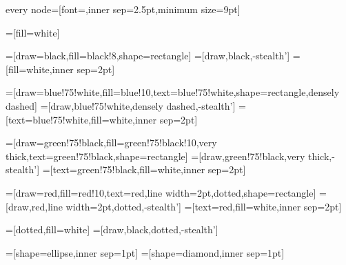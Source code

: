 \usepackage{tikz}
\usetikzlibrary{arrows,automata,positioning,er}

\tikzstyle every node=[font=\footnotesize\sffamily,inner sep=2.5pt,minimum size=9pt]

\newcommand{\red}{red}
\newcommand{\redfill}{\red!10}
\newcommand{\green}{green!75!black}
\newcommand{\greenfill}{\green!10}
\newcommand{\blue}{blue!75!white}
\newcommand{\bluefill}{blue!10}
\newcommand{\grey}{black!8}
=[fill=white]

=[draw=black,fill=\grey,shape=rectangle]
=[draw,black,-stealth']
=[fill=white,inner sep=2pt]

=[draw=\blue,fill=\bluefill,text=\blue,shape=rectangle,densely dashed]
=[draw,\blue,densely dashed,-stealth']
=[text=\blue,fill=white,inner sep=2pt]

=[draw=\green,fill=\greenfill,very thick,text=\green,shape=rectangle]
=[draw,\green,very thick,-stealth']
=[text=\green,fill=white,inner sep=2pt]

=[draw=\red,fill=\redfill,text=\red,line width=2pt,dotted,shape=rectangle]
=[draw,\red,line width=2pt,dotted,-stealth']
=[text=\red,fill=white,inner sep=2pt]

=[dotted,fill=white]
=[draw,black,dotted,-stealth']

=[shape=ellipse,inner sep=1pt]
=[shape=diamond,inner sep=1pt]

\newcommand{\ml}[1]{
\begin{tabular}{@{}l@{}}#1\vspace{-2pt}\end{tabular}
}

\newcommand{\userdefinedmacro}{\relax}
